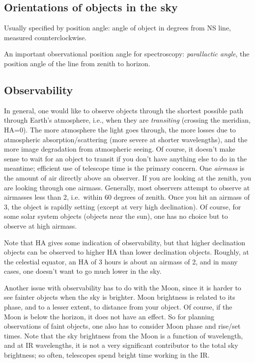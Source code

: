 \documentclass[12pt]{article}
\begin{document}
\subsection*{Orientations of objects in the sky}
Usually specified by position angle: angle of object in degrees from NS line,
measured counterclockwise.

An important observational position angle for spectroscopy:
\emph{parallactic angle}, the position angle of the line from zenith to
horizon.

\subsection*{Observability}
In general, one would like to observe objects through the shortest
possible path through Earth's atmosphere, i.e., when they are \emph{transiting}
(crossing the meridian, HA=0). The more atmosphere the light goes through,
the more losses due to atmospheric absorption/scattering (more severe at
shorter wavelengths), and the more image degradation from atmospheric seeing.
Of course, it doesn't make sense to wait for an object to transit if you
don't have anything else to do in the meantime; efficient use of telescope time
is the primary concern.
One \emph{airmass} is the amount of air directly above an observer.
If you are looking at the zenith, you are looking through one airmass.
Generally, most observers attempt to observe at airmasses
less than 2, i.e.\ within 60 degrees of zenith. Once you hit an airmass
of 3, the object is rapidly setting (except at very high declination).
Of course, for some solar system objects (objects near the sun), one has no
choice but to observe at high airmass.

Note that HA gives some indication of observability, but that
higher declination objects can be observed to higher HA than lower
declination objects. Roughly, at the celestial equator, an HA of 3 hours
is about an airmass of 2, and in many cases, one doesn't want to go much
lower in the sky.

Another issue with observability has to do with the Moon,
since it is harder to see fainter objects when the sky is brighter.
Moon brightness is related to its phase, and to a lesser extent, to
distance from your object. Of course, if the Moon is below the horizon,
it does not have an effect. So for planning observations of faint objects,
one also has to consider Moon phase and rise/set times. Note that the
sky brightness from the Moon is a function of wavelength, and at IR
wavelengths, it is not a very significant contributor to the total sky
brightness; so often, telescopes spend bright time working in the IR.
\end{document}

